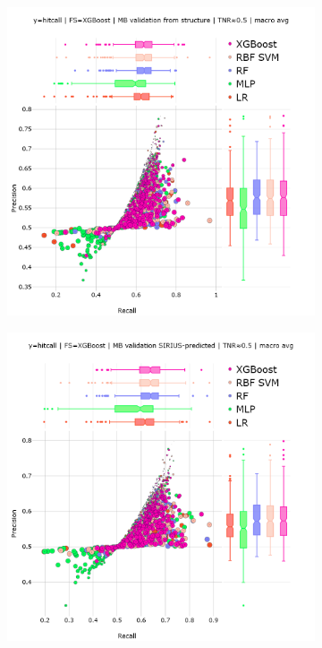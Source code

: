 \begin{figure}[htbp]
  \centering
  \begin{subfigure}[b]{0.495\textwidth}
      \centering
      \includegraphics[width=\textwidth]{generated_results/hitcall_classification_Feature_Selection_XGBClassifier_mb_val_structure_tnr_macro_avg.png}
      \caption{}
  \label{fig:hitcall_classification_Feature_Selection_XGBClassifier_mb_val_structure_tnr_macro_avg}
  \end{subfigure}
  \hfill
  \begin{subfigure}[b]{0.495\textwidth}
      \centering
      \includegraphics[width=\textwidth]{generated_results/hitcall_classification_Feature_Selection_XGBClassifier_mb_val_sirius_tnr_macro_avg.png}

\end{subfigure}
\end{figure}
